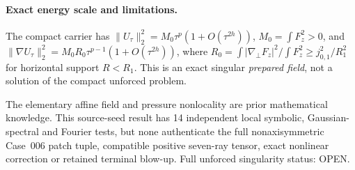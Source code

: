 \paragraph{Exact energy scale and limitations.}
The compact carrier has
$\|U_\tau\|_2^2=M_0\tau^p(1+O(\tau^{2h}))$, $M_0=\int F_z^2>0$, and
$\|\nabla U_\tau\|_2^2=M_0R_0\tau^{p-1}(1+O(\tau^{2h}))$, where
$R_0=\int|\nabla_\perp F_z|^2/\int F_z^2\ge j_{0,1}^2/R_1^2$ for horizontal support $R<R_1$. This is an exact singular \emph{prepared field}, not a solution of the compact unforced problem.

The elementary affine field and pressure nonlocality are prior mathematical knowledge. This source-seed result has 14 independent local symbolic, Gaussian-spectral and Fourier tests, but none authenticate the full nonaxisymmetric Case~006 patch tuple, compatible positive seven-ray tensor, exact nonlinear correction or retained terminal blow-up. Full unforced singularity status: OPEN.

